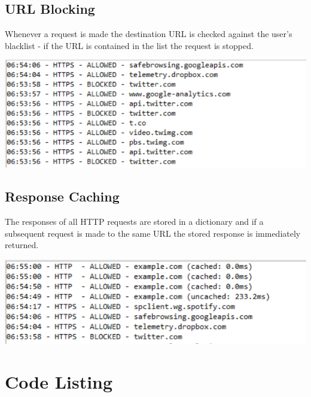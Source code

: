 \documentclass[12pt]{article}
\begin{document}
\subsection{URL Blocking}

\noindent Whenever a request is made the destination URL is checked against the user's blacklist - if the URL is contained in the list the request is stopped.

\begin{center}
\includegraphics[scale=0.9]{block.png}
\end{center}

\subsection{Response Caching}

\noindent The responses of all HTTP requests are stored in a dictionary and if a subsequent request is made to the same URL the stored response is immediately returned.

\begin{center}
\includegraphics[scale=0.9]{cache.png}
\end{center}

\section{Code Listing}

\lstset{%
    language=Python,
    basicstyle=\small,
    breaklines=true
}

\end{document}
